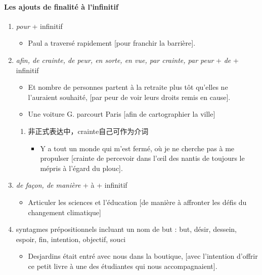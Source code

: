 \documentclass[UTF8]{report}
\begin{document}
\paragraph{Les ajouts de finalité à l’infinitif}
\begin{enumerate}
    \item \textit{pour} + infinitif 
    \begin{itemize}
        \item Paul a traversé rapidement [pour franchir la barrière].
    \end{itemize}
    \item \textit{afin, de crainte, de peur, en sorte, en vue, par crainte, par peur} + \textit{de} + infinitif
    \begin{itemize}
        \item Et nombre de personnes partent à la retraite plus tôt qu’elles ne l’auraient souhaité, [par peur de voir leurs droits remis en cause].
        \item Une voiture G. parcourt Paris [afin de cartographier la ville]
    \end{itemize}
    \begin{enumerate}
        \item 非正式表达中，crainte自己可作为介词
        \begin{itemize}
            \item Y a tout un monde qui m’est fermé, où je ne cherche pas à me propulser [crainte de percevoir dans l’œil des nantis de toujours le mépris à l’égard du plouc].
        \end{itemize}
    \end{enumerate}
    \item \textit{de façon, de manière} + à + infinitif
    \begin{itemize}
        \item Articuler les sciences et l’éducation [de manière à affronter les défis du changement climatique] 
    \end{itemize}
    \item syntagmes prépositionnels incluant un nom de but : but, désir, dessein, espoir, fin, intention, objectif, souci
    \begin{itemize}
        \item Desjardins était entré avec nous dans la boutique, [avec l’intention d’offrir ce petit livre à une des étudiantes qui nous accompagnaient]. 
    \end{itemize}
\end{enumerate}
\end{document}
